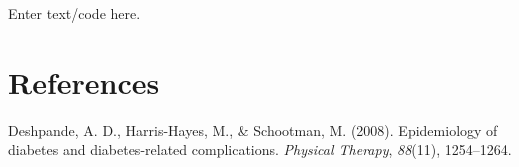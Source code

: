 \documentclass[
  man,floatsintext]{apa6}
\newlength{\cslhangindent}
\newlength{\cslentryspacingunit} %
\newenvironment{CSLReferences}[2] %
 {%
  \setlength{\parindent}{0pt}
  \ifodd #1
  \let\oldpar\par
  \def\par{\hangindent=\cslhangindent\oldpar}
  \fi
  \setlength{\parskip}{#2\cslentryspacingunit}
 }%
 {}
\begin{document}
Enter text/code here.

\newpage

\hypertarget{references}{%
\section{References}\label{references}}




\hypertarget{refs}{}
\begin{CSLReferences}{1}{0}
\leavevmode{}%
Deshpande, A. D., Harris-Hayes, M., \& Schootman, M. (2008). Epidemiology of diabetes and diabetes-related complications. \emph{Physical Therapy}, \emph{88}(11), 1254--1264.

\end{CSLReferences}


\clearpage
\renewcommand{\listfigurename}{Figure captions}
\listoffigures
\clearpage
\renewcommand{\listtablename}{Table captions}
\listoftables
\end{document}
